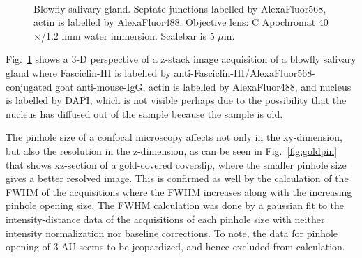 \begin{figure}[h!]
\centering
{}\hspace{0.1em}
\hspace{0.1em}
\\
\caption{Blowfly salivary gland. 
Septate junctions labelled by AlexaFluor568, actin is labelled by AlexaFluor488. 
Objective lens: C Apochromat 40$\times$/1.2 lmm water immersion. 
Scalebar is 5 $\mu$m.}
\label{fig:what}
\end{figure}

Fig.~\ref{fig:what} shows a 3-D perspective of a z-stack image acquisition of a blowfly salivary gland where Fasciclin-III is labelled by anti-Fasciclin-III/AlexaFluor568-conjugated goat anti-mouse-IgG, actin is labelled by AlexaFluor488, and nucleus is labelled by DAPI, which is not visible perhaps due to the possibility that the nucleus has diffused out of the sample because the sample is old. 

The pinhole size of a confocal microscopy affects not only in the xy-dimension, but also the resolution in the z-dimension, as can be seen in Fig.~\ref{fig:goldpin} that shows xz-section of a gold-covered coverslip, where the smaller pinhole size gives a better resolved image. 
This is confirmed as well by the calculation of the FWHM of the acquisitions where the FWHM increases along with the increasing pinhole opening size. 
The FWHM calculation was done by a gaussian fit to the intensity-distance data of the acquisitions of each pinhole size with neither intensity normalization nor baseline corrections. 
To note, the data for pinhole opening of 3 AU seems to be jeopardized, and hence excluded from calculation. 

